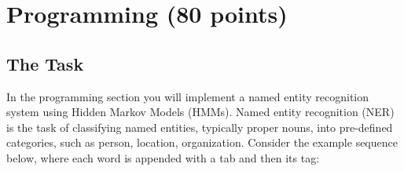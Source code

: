 \documentclass[11pt,addpoints,answers]{exam}
\begin{document}
\begin{questions}

\end{questions}

\clearpage
\section{Programming (80 points)}
\label{programming}

\subsection{The Task}\label{task}
In the programming section you will implement a named entity recognition system using Hidden Markov Models (HMMs). Named entity recognition (NER) is the task of classifying named entities, typically proper nouns,  into pre-defined categories, such as person, location, organization. Consider the example sequence below, where each word is appended with a tab and then its tag:
\end{document}
